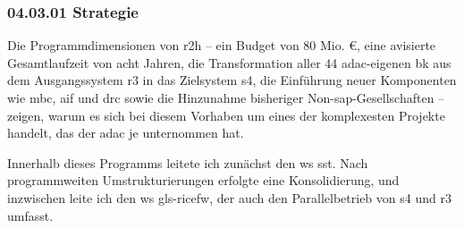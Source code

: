 \subsubsection*{04.03.01 Strategie  } 
\label{04.03.01	Strategie}

\par Die Programmdimensionen von \gls{r2h} – ein Budget von 80 Mio. €, eine avisierte Gesamtlaufzeit von acht Jahren, die Transformation aller 44 \gls{adac}-eigenen \gls{bk} aus dem Ausgangssystem \gls{r3} in das Zielsystem \gls{s4}, die Einführung neuer Komponenten wie \gls{mbc}, \gls{aif} und \gls{drc} sowie die Hinzunahme bisheriger Non-\gls{sap}-Gesellschaften – zeigen, warum es sich bei diesem Vorhaben um eines der komplexesten Projekte handelt, das der \gls{adac} je unternommen hat.
\par Innerhalb dieses Programms leitete ich zunächst den \gls{ws} \gls{sst}. Nach programmweiten Umstrukturierungen erfolgte eine Konsolidierung, und inzwischen leite ich den \gls{ws} \gls{gls-ricefw}, der auch den Parallelbetrieb von \gls{s4} und \gls{r3} umfasst.